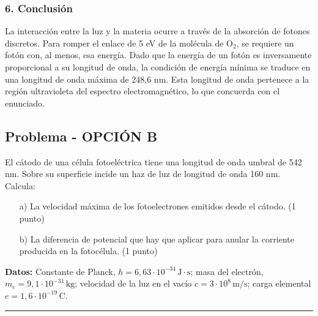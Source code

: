 \subsubsection*{6. Conclusión}
\begin{cajaconclusion}
La interacción entre la luz y la materia ocurre a través de la absorción de fotones discretos. Para romper el enlace de 5 eV de la molécula de O$_2$, se requiere un fotón con, al menos, esa energía. Dado que la energía de un fotón es inversamente proporcional a su longitud de onda, la condición de energía mínima se traduce en una longitud de onda máxima de 248,6 nm. Esta longitud de onda pertenece a la región ultravioleta del espectro electromagnético, lo que concuerda con el enunciado.
\end{cajaconclusion}

\newpage
\subsection{Problema - OPCIÓN B}
\label{subsec:VB_2012_sep}

\begin{cajaenunciado}
El cátodo de una célula fotoeléctrica tiene una longitud de onda umbral de 542 nm. Sobre su superficie incide un haz de luz de longitud de onda 160 nm. Calcula:
\begin{enumerate}
    \item[a)] La velocidad máxima de los fotoelectrones emitidos desde el cátodo. (1 punto)
    \item[b)] La diferencia de potencial que hay que aplicar para anular la corriente producida en la fotocélula. (1 punto)
\end{enumerate}
\textbf{Datos:} Constante de Planck, $h=6,63\cdot10^{-34}\,\text{J}\cdot\text{s}$; masa del electrón, $m_e=9,1\cdot10^{-31}\,\text{kg}$; velocidad de la luz en el vacío $c=3\cdot10^8\,\text{m/s}$; carga elemental $e=1,6\cdot10^{-19}\,\text{C}$.
\end{cajaenunciado}
\hrule


